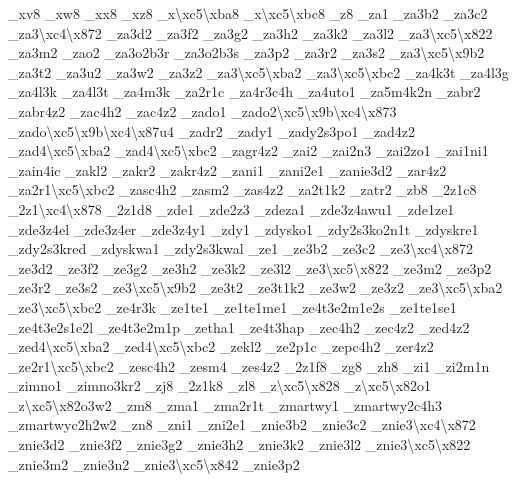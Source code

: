 \begin{DoxyCompactItemize}
\-\_\-xv8 \-\_\-xw8 \-\_\-xx8 \-\_\-xz8 \-\_\-x\textbackslash{}xc5\textbackslash{}xba8 \-\_\-x\textbackslash{}xc5\textbackslash{}xbc8 \-\_\-z8 \-\_\-za1 \-\_\-za3b2 \-\_\-za3c2 \-\_\-za3\textbackslash{}xc4\textbackslash{}x872 \-\_\-za3d2 \-\_\-za3f2 \-\_\-za3g2 \-\_\-za3h2 \-\_\-za3k2 \-\_\-za3l2 \-\_\-za3\textbackslash{}xc5\textbackslash{}x822 \-\_\-za3m2 \-\_\-zao2 \-\_\-za3o2b3r \-\_\-za3o2b3s \-\_\-za3p2 \-\_\-za3r2 \-\_\-za3s2 \-\_\-za3\textbackslash{}xc5\textbackslash{}x9b2 \-\_\-za3t2 \-\_\-za3u2 \-\_\-za3w2 \-\_\-za3z2 \-\_\-za3\textbackslash{}xc5\textbackslash{}xba2 \-\_\-za3\textbackslash{}xc5\textbackslash{}xbc2 \-\_\-za4k3t \-\_\-za4l3g \-\_\-za4l3k \-\_\-za4l3t \-\_\-za4m3k \-\_\-za2r1c \-\_\-za4r3c4h \-\_\-za4uto1 \-\_\-za5m4k2n \-\_\-zabr2 \-\_\-zabr4z2 \-\_\-zac4h2 \-\_\-zac4z2 \-\_\-zado1 \-\_\-zado2\textbackslash{}xc5\textbackslash{}x9b\textbackslash{}xc4\textbackslash{}x873 \-\_\-zado\textbackslash{}xc5\textbackslash{}x9b\textbackslash{}xc4\textbackslash{}x87u4 \-\_\-zadr2 \-\_\-zady1 \-\_\-zady2s3po1 \-\_\-zad4z2 \-\_\-zad4\textbackslash{}xc5\textbackslash{}xba2 \-\_\-zad4\textbackslash{}xc5\textbackslash{}xbc2 \-\_\-zagr4z2 \-\_\-zai2 \-\_\-zai2n3 \-\_\-zai2zo1 \-\_\-zai1ni1 \-\_\-zain4ic \-\_\-zakl2 \-\_\-zakr2 \-\_\-zakr4z2 \-\_\-zani1 \-\_\-zani2e1 \-\_\-zanie3d2 \-\_\-zar4z2 \-\_\-za2r1\textbackslash{}xc5\textbackslash{}xbc2 \-\_\-zasc4h2 \-\_\-zasm2 \-\_\-zas4z2 \-\_\-za2t1k2 \-\_\-zatr2 \-\_\-zb8 \-\_\-2z1c8 \-\_\-2z1\textbackslash{}xc4\textbackslash{}x878 \-\_\-2z1d8 \-\_\-zde1 \-\_\-zde2z3 \-\_\-zdeza1 \-\_\-zde3z4awu1 \-\_\-zde1ze1 \-\_\-zde3z4el \-\_\-zde3z4er \-\_\-zde3z4y1 \-\_\-zdy1 \-\_\-zdysko1 \-\_\-zdy2s3ko2n1t \-\_\-zdyskre1 \-\_\-zdy2s3kred \-\_\-zdyskwa1 \-\_\-zdy2s3kwal \-\_\-ze1 \-\_\-ze3b2 \-\_\-ze3c2 \-\_\-ze3\textbackslash{}xc4\textbackslash{}x872 \-\_\-ze3d2 \-\_\-ze3f2 \-\_\-ze3g2 \-\_\-ze3h2 \-\_\-ze3k2 \-\_\-ze3l2 \-\_\-ze3\textbackslash{}xc5\textbackslash{}x822 \-\_\-ze3m2 \-\_\-ze3p2 \-\_\-ze3r2 \-\_\-ze3s2 \-\_\-ze3\textbackslash{}xc5\textbackslash{}x9b2 \-\_\-ze3t2 \-\_\-ze3t1k2 \-\_\-ze3w2 \-\_\-ze3z2 \-\_\-ze3\textbackslash{}xc5\textbackslash{}xba2 \-\_\-ze3\textbackslash{}xc5\textbackslash{}xbc2 \-\_\-ze4r3k \-\_\-ze1te1 \-\_\-ze1te1me1 \-\_\-ze4t3e2m1e2s \-\_\-ze1te1se1 \-\_\-ze4t3e2s1e2l \-\_\-ze4t3e2m1p \-\_\-zetha1 \-\_\-ze4t3hap \-\_\-zec4h2 \-\_\-zec4z2 \-\_\-zed4z2 \-\_\-zed4\textbackslash{}xc5\textbackslash{}xba2 \-\_\-zed4\textbackslash{}xc5\textbackslash{}xbc2 \-\_\-zekl2 \-\_\-ze2p1c \-\_\-zepc4h2 \-\_\-zer4z2 \-\_\-ze2r1\textbackslash{}xc5\textbackslash{}xbc2 \-\_\-zesc4h2 \-\_\-zesm4 \-\_\-zes4z2 \-\_\-2z1f8 \-\_\-zg8 \-\_\-zh8 \-\_\-zi1 \-\_\-zi2m1n \-\_\-zimno1 \-\_\-zimno3kr2 \-\_\-zj8 \-\_\-2z1k8 \-\_\-zl8 \-\_\-z\textbackslash{}xc5\textbackslash{}x828 \-\_\-z\textbackslash{}xc5\textbackslash{}x82o1 \-\_\-z\textbackslash{}xc5\textbackslash{}x82o3w2 \-\_\-zm8 \-\_\-zma1 \-\_\-zma2r1t \-\_\-zmartwy1 \-\_\-zmartwy2c4h3 \-\_\-zmartwyc2h2w2 \-\_\-zn8 \-\_\-zni1 \-\_\-zni2e1 \-\_\-znie3b2 \-\_\-znie3c2 \-\_\-znie3\textbackslash{}xc4\textbackslash{}x872 \-\_\-znie3d2 \-\_\-znie3f2 \-\_\-znie3g2 \-\_\-znie3h2 \-\_\-znie3k2 \-\_\-znie3l2 \-\_\-znie3\textbackslash{}xc5\textbackslash{}x822 \-\_\-znie3m2 \-\_\-znie3n2 \-\_\-znie3\textbackslash{}xc5\textbackslash{}x842 \-\_\-znie3p2 
\end{DoxyCompactItemize}
